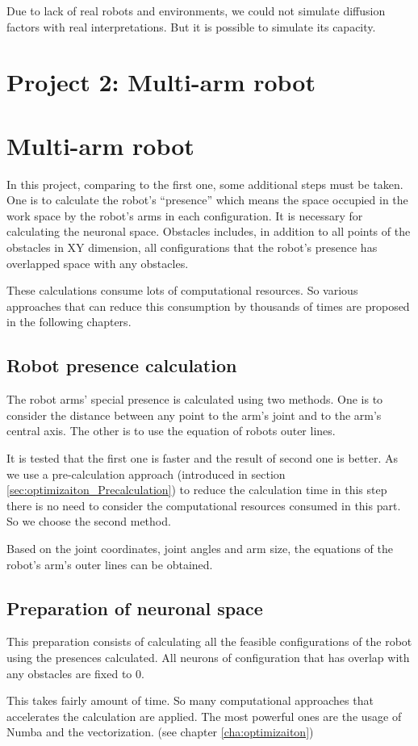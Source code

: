 Due to lack of real robots and environments, we could not simulate diffusion factors with real interpretations. 
But it is possible to simulate its capacity. 


\section{Project 2: Multi-arm robot}
\label{sec:algorithm_project2}
\section{Multi-arm robot}
\label{sec:algorithm_project2}
In this project, comparing to the first one, some additional steps must be taken.
One is to calculate the robot’s “presence” which means the space occupied in the work space by the robot’s arms in each configuration.
It is necessary for calculating the neuronal space.
Obstacles includes, in addition to all points of the obstacles in XY dimension,
all configurations that the robot’s presence has overlapped space with any obstacles.

These calculations consume lots of computational resources.
So various approaches that can reduce this consumption by thousands of times are proposed in the following chapters.

\subsection{Robot presence calculation}
\label{ssec:algorithm_presence}
The robot arms’ special presence is calculated using two methods.
One is to consider the distance between any point to the arm’s joint and to the arm’s central axis.
The other is to use the equation of robots outer lines.

It is tested that the first one is faster and the result of second one is better.
As we use a pre-calculation approach (introduced in section \ref{sec:optimizaiton_Precalculation}) to reduce the calculation time
in this step there is no need to consider the computational resources consumed in this part.
So we choose the second method.

Based on the joint coordinates, joint angles and arm size, the equations of the robot's arm's outer lines can be obtained.

\subsection{Preparation of neuronal space}
\label{ssec:algorithm_project2_space}
This preparation consists of calculating all the feasible configurations of the robot using the presences calculated.
All neurons of configuration that has overlap with any obstacles are fixed to 0.

This takes fairly amount of time.
So many computational approaches that accelerates the calculation are applied.
The most powerful ones are the usage of Numba and the vectorization. (see chapter \ref{cha:optimizaiton})
